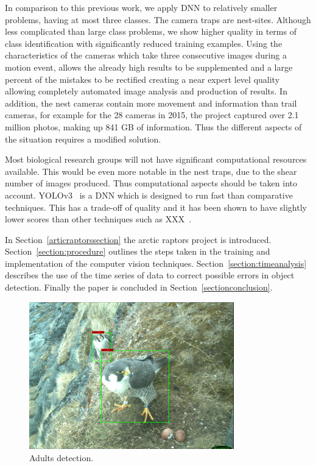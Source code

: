 \documentclass[journal]{IEEEtran}
\begin{document}
In comparison to this previous work, we apply DNN to relatively smaller problems, having at most three classes. The camera traps are nest-sites. Although less complicated than large class problems, we show higher quality in terms of class identification with significantly reduced training examples. Using the characteristics of the cameras which take three consecutive images during a motion event, allows the already high results to be supplemented and a large percent of the mistakes to be rectified creating a near expert level quality allowing completely automated image analysis and production of results. In addition, the nest cameras contain more movement and information than trail cameras, for example for the 28 cameras in 2015, the project captured over 2.1 million photos, making up 841 GB of information. Thus the different aspects of the situation requires a modified solution. 

Most biological research groups will not have significant computational resources available. This would be even more notable in the nest traps, due to the shear number of images produced. Thus computational aspects should be taken into account. YOLOv3~\cite{redmon2018yolov3} is a DNN which is designed to run fast than comparative techniques. This has a trade-off of quality and it has been shown to have slightly lower scores than other techniques such as XXX~\cite{redmon2018yolov3}. 

In Section~\ref{articraptorssection} the arctic raptors project is introduced. Section~\ref{section:procedure} outlines the steps taken in the training and implementation of the computer vision techniques. Section~\ref{section:timeanalysis} describes the use of the time series of data to correct possible errors in object detection. Finally the paper is concluded in Section~\ref{sectionconclusion}.  





\begin{figure}[!tb]
	\centering
	\includegraphics[width=3.5in]{adults.jpg}
	\caption{Adults detection.}
	\label{adults}
\end{figure}
\end{document}
